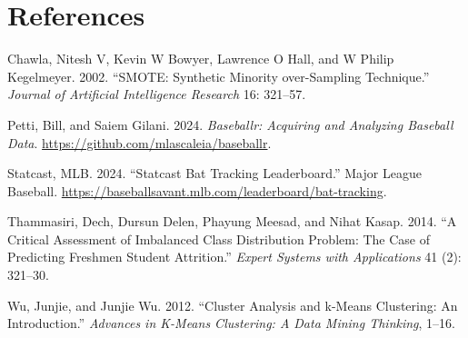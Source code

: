 \documentclass[
  letterpaper,
  DIV=11,
  numbers=noendperiod]{scrartcl}
\newlength{\cslhangindent}
\newenvironment{CSLReferences}[2] %
 {\begin{list}{}{%
  \setlength{\itemindent}{0pt}
  \setlength{\leftmargin}{0pt}
  \setlength{\parsep}{0pt}
  \ifodd #1
   \setlength{\leftmargin}{\cslhangindent}
   \setlength{\itemindent}{-1\cslhangindent}
  \fi
  \setlength{\itemsep}{#2\baselineskip}}}
 {\end{list}}
\begin{document}
\newpage

\section*{References}\label{references}

\label{refs}
\begin{CSLReferences}{1}{0}
Chawla, Nitesh V, Kevin W Bowyer, Lawrence O Hall, and W Philip
Kegelmeyer. 2002. {``SMOTE: Synthetic Minority over-Sampling
Technique.''} \emph{Journal of Artificial Intelligence Research} 16:
321--57.

Petti, Bill, and Saiem Gilani. 2024. \emph{Baseballr: Acquiring and
Analyzing Baseball Data}. \url{https://github.com/mlascaleia/baseballr}.

Statcast, MLB. 2024. {``Statcast Bat Tracking Leaderboard.''} Major
League Baseball.
\url{https://baseballsavant.mlb.com/leaderboard/bat-tracking}.

Thammasiri, Dech, Dursun Delen, Phayung Meesad, and Nihat Kasap. 2014.
{``A Critical Assessment of Imbalanced Class Distribution Problem: The
Case of Predicting Freshmen Student Attrition.''} \emph{Expert Systems
with Applications} 41 (2): 321--30.

Wu, Junjie, and Junjie Wu. 2012. {``Cluster Analysis and k-Means
Clustering: An Introduction.''} \emph{Advances in K-Means Clustering: A
Data Mining Thinking}, 1--16.

\end{CSLReferences}
\end{document}
